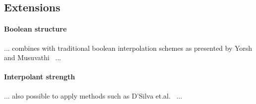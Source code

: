 
\subsection{Extensions}

\paragraph{Boolean structure}
... combines with traditional boolean interpolation schemes as presented by Yorsh and Musuvathi~\cite{DBLP:conf/cade/YorshM05} ...

\paragraph{Interpolant strength}
... also possible to apply methods such as D'Silva et.al.~\cite{DBLP:conf/vmcai/DSilvaKPW10} ...

